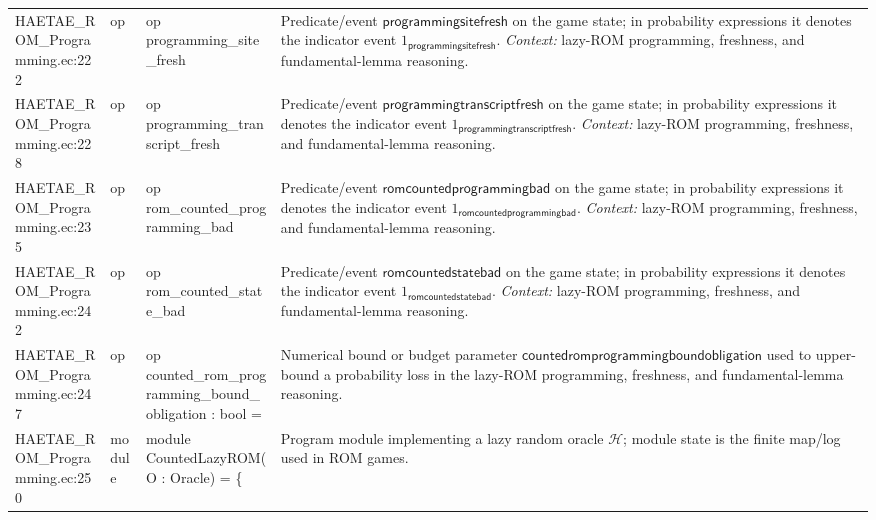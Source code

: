 \documentclass[10pt]{article}
\begin{document}
\begin{longtable}{L{0.11\textwidth}L{0.055\textwidth}L{0.385\textwidth}L{0.41\textwidth}}
HAETAE\_\allowbreak{}ROM\_\allowbreak{}Programming.\allowbreak{}ec:\allowbreak{}222 & op & {\ttfamily\scriptsize op programming\_\allowbreak{}site\_\allowbreak{}fresh} & Predicate/event $\mathsf{programmingsitefresh}$ on the game state; in probability expressions it denotes the indicator event $1_{\mathsf{programmingsitefresh}}$. \emph{Context:} lazy-ROM programming, freshness, and fundamental-lemma reasoning. \\
HAETAE\_\allowbreak{}ROM\_\allowbreak{}Programming.\allowbreak{}ec:\allowbreak{}228 & op & {\ttfamily\scriptsize op programming\_\allowbreak{}transcript\_\allowbreak{}fresh} & Predicate/event $\mathsf{programmingtranscriptfresh}$ on the game state; in probability expressions it denotes the indicator event $1_{\mathsf{programmingtranscriptfresh}}$. \emph{Context:} lazy-ROM programming, freshness, and fundamental-lemma reasoning. \\
HAETAE\_\allowbreak{}ROM\_\allowbreak{}Programming.\allowbreak{}ec:\allowbreak{}235 & op & {\ttfamily\scriptsize op rom\_\allowbreak{}counted\_\allowbreak{}programming\_\allowbreak{}bad} & Predicate/event $\mathsf{romcountedprogrammingbad}$ on the game state; in probability expressions it denotes the indicator event $1_{\mathsf{romcountedprogrammingbad}}$. \emph{Context:} lazy-ROM programming, freshness, and fundamental-lemma reasoning. \\
HAETAE\_\allowbreak{}ROM\_\allowbreak{}Programming.\allowbreak{}ec:\allowbreak{}242 & op & {\ttfamily\scriptsize op rom\_\allowbreak{}counted\_\allowbreak{}state\_\allowbreak{}bad} & Predicate/event $\mathsf{romcountedstatebad}$ on the game state; in probability expressions it denotes the indicator event $1_{\mathsf{romcountedstatebad}}$. \emph{Context:} lazy-ROM programming, freshness, and fundamental-lemma reasoning. \\
HAETAE\_\allowbreak{}ROM\_\allowbreak{}Programming.\allowbreak{}ec:\allowbreak{}247 & op & {\ttfamily\scriptsize op counted\_\allowbreak{}rom\_\allowbreak{}programming\_\allowbreak{}bound\_\allowbreak{}obligation : bool =} & Numerical bound or budget parameter $\mathsf{countedromprogrammingboundobligation}$ used to upper-bound a probability loss in the lazy-ROM programming, freshness, and fundamental-lemma reasoning. \\
HAETAE\_\allowbreak{}ROM\_\allowbreak{}Programming.\allowbreak{}ec:\allowbreak{}250 & module & {\ttfamily\scriptsize module CountedLazyROM(O : Oracle) = \{} & Program module implementing a lazy random oracle $\mathcal H$; module state is the finite map/log used in ROM games. \\

\end{longtable}
\end{document}
